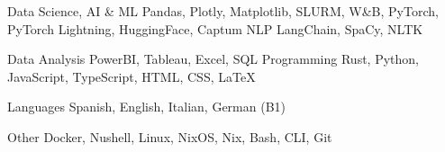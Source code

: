 

\begin{cvskills}


  \cvskill
    {Data Science, AI \& ML} %
    {Pandas, Plotly, Matplotlib, SLURM, W\&B, PyTorch, PyTorch Lightning, HuggingFace, Captum} %
  \cvskill
    {NLP} %
    {LangChain, SpaCy, NLTK} %

  \cvskill
    {Data Analysis}
    {PowerBI, Tableau, Excel, SQL}
  \cvskill
    {Programming} %
    {Rust, Python, JavaScript, TypeScript, HTML, CSS, LaTeX} %

  \cvskill
    {Languages} %
    {Spanish, English, Italian, German (B1)} %

  \cvskill
    {Other}
    {Docker, Nushell, Linux, NixOS, Nix, Bash, CLI, Git}

\end{cvskills}
